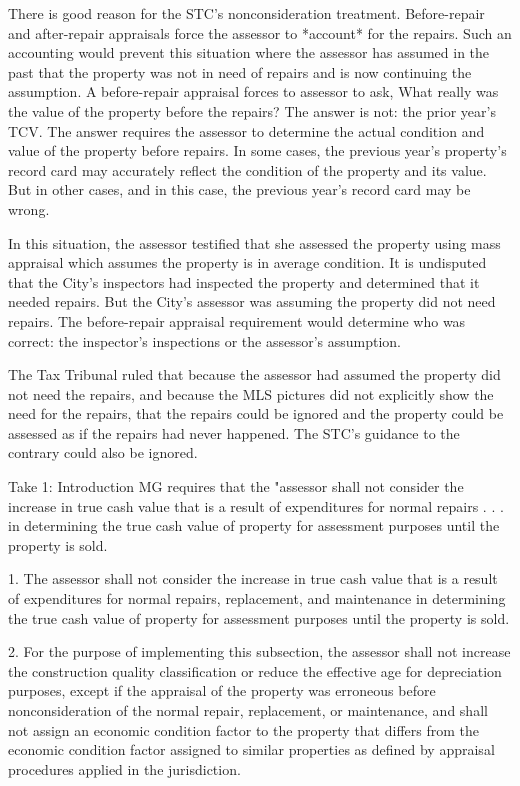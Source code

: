 There is good reason for the STC's nonconsideration treatment. Before-repair and after-repair appraisals force the assessor to *account* for the repairs. Such an accounting would prevent this situation where the assessor has assumed in the past that the property was not in need of repairs and is now continuing the assumption. A before-repair appraisal forces to assessor to ask, What really was the value of the property before the repairs?  The answer is not: the prior year's TCV. The answer requires the assessor to determine the actual condition and value of the property before repairs. In some cases, the previous year's property's record card may accurately reflect the condition of the property and its value. But in other cases, and in this case, the previous year's record card may be wrong. 

In this situation, the assessor testified that she assessed the property using mass appraisal which assumes the property is in average condition. It is undisputed that the City's inspectors had inspected the property and determined that it needed repairs. But the City's assessor was assuming the property did not need repairs. The before-repair appraisal requirement would determine who was correct: the inspector's inspections or the assessor's assumption. 

The Tax Tribunal ruled that because the assessor had assumed the property did not need the repairs, and because the MLS pictures did not explicitly show the need for the repairs, that the repairs could be ignored and the property could be assessed as if the repairs had never happened. The STC's guidance to the contrary could also be ignored. 




Take 1:
Introduction MG requires that the "assessor shall not consider the increase in true cash value that is a result of expenditures for normal repairs . . . in determining the true cash value of property for assessment purposes until the property is sold. 

1. The assessor shall not consider the increase in true cash value that is a result of expenditures for normal repairs, replacement, and maintenance in determining the true cash value of property for assessment purposes until the property is sold. 

2. For the purpose of implementing this subsection, the assessor shall not increase the construction quality classification or reduce the effective age for depreciation purposes, except if the appraisal of the property was erroneous before nonconsideration of the normal repair, replacement, or maintenance, and shall not assign an economic condition factor to the property that differs from the economic condition factor assigned to similar properties as defined by appraisal procedures applied in the jurisdiction. 


